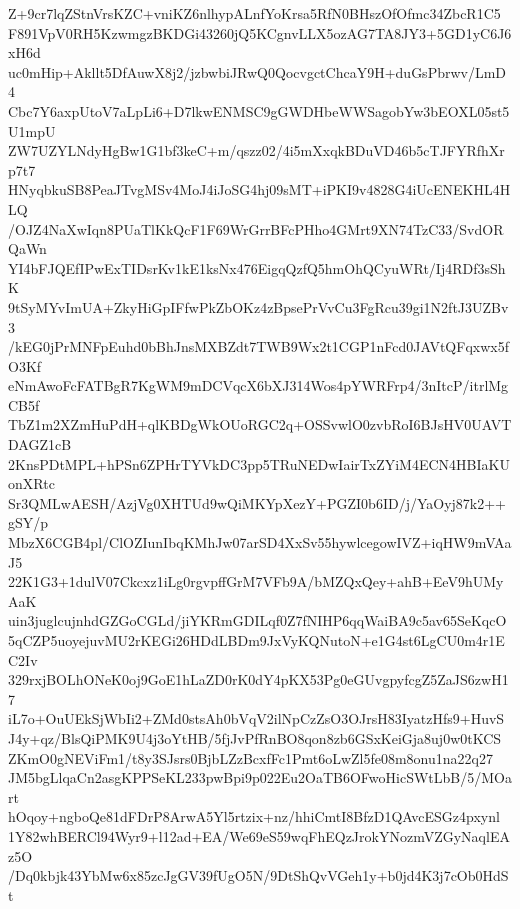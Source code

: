 Z+9cr7lqZStnVrsKZC+vniKZ6nlhypALnfYoKrsa5RfN0BHszOfOfmc34ZbcR1C5
F891VpV0RH5KzwmgzBKDGi43260jQ5KCgnvLLX5ozAG7TA8JY3+5GD1yC6J6xH6d
uc0mHip+Akllt5DfAuwX8j2/jzbwbiJRwQ0QocvgctChcaY9H+duGsPbrwv/LmD4
Cbc7Y6axpUtoV7aLpLi6+D7lkwENMSC9gGWDHbeWWSagobYw3bEOXL05st5U1mpU
ZW7UZYLNdyHgBw1G1bf3keC+m/qszz02/4i5mXxqkBDuVD46b5cTJFYRfhXrp7t7
HNyqbkuSB8PeaJTvgMSv4MoJ4iJoSG4hj09sMT+iPKI9v4828G4iUcENEKHL4HLQ
/OJZ4NaXwIqn8PUaTlKkQcF1F69WrGrrBFcPHho4GMrt9XN74TzC33/SvdORQaWn
YI4bFJQEfIPwExTIDsrKv1kE1ksNx476EigqQzfQ5hmOhQCyuWRt/Ij4RDf3sShK
9tSyMYvImUA+ZkyHiGpIFfwPkZbOKz4zBpsePrVvCu3FgRcu39gi1N2ftJ3UZBv3
/kEG0jPrMNFpEuhd0bBhJnsMXBZdt7TWB9Wx2t1CGP1nFcd0JAVtQFqxwx5fO3Kf
eNmAwoFcFATBgR7KgWM9mDCVqcX6bXJ314Wos4pYWRFrp4/3nItcP/itrlMgCB5f
TbZ1m2XZmHuPdH+qlKBDgWkOUoRGC2q+OSSvwlO0zvbRoI6BJsHV0UAVTDAGZ1cB
2KnsPDtMPL+hPSn6ZPHrTYVkDC3pp5TRuNEDwIairTxZYiM4ECN4HBIaKUonXRtc
Sr3QMLwAESH/AzjVg0XHTUd9wQiMKYpXezY+PGZI0b6ID/j/YaOyj87k2++gSY/p
MbzX6CGB4pl/ClOZIunIbqKMhJw07arSD4XxSv55hywlcegowIVZ+iqHW9mVAaJ5
22K1G3+1dulV07Ckcxz1iLg0rgvpffGrM7VFb9A/bMZQxQey+ahB+EeV9hUMyAaK
uin3juglcujnhdGZGoCGLd/jiYKRmGDILqf0Z7fNIHP6qqWaiBA9c5av65SeKqcO
5qCZP5uoyejuvMU2rKEGi26HDdLBDm9JxVyKQNutoN+e1G4st6LgCU0m4r1EC2Iv
329rxjBOLhONeK0oj9GoE1hLaZD0rK0dY4pKX53Pg0eGUvgpyfcgZ5ZaJS6zwH17
iL7o+OuUEkSjWbIi2+ZMd0stsAh0bVqV2ilNpCzZsO3OJrsH83IyatzHfs9+HuvS
J4y+qz/BlsQiPMK9U4j3oYtHB/5fjJvPfRnBO8qon8zb6GSxKeiGja8uj0w0tKCS
ZKmO0gNEViFm1/t8y3SJsrs0BjbLZzBcxfFc1Pmt6oLwZl5fe08m8onu1na22q27
JM5bgLlqaCn2asgKPPSeKL233pwBpi9p022Eu2OaTB6OFwoHicSWtLbB/5/MOart
hOqoy+ngboQe81dFDrP8ArwA5Yl5rtzix+nz/hhiCmtI8BfzD1QAvcESGz4pxynl
1Y82whBERCl94Wyr9+l12ad+EA/We69eS59wqFhEQzJrokYNozmVZGyNaqlEAz5O
/Dq0kbjk43YbMw6x85zcJgGV39fUgO5N/9DtShQvVGeh1y+b0jd4K3j7cOb0HdSt
